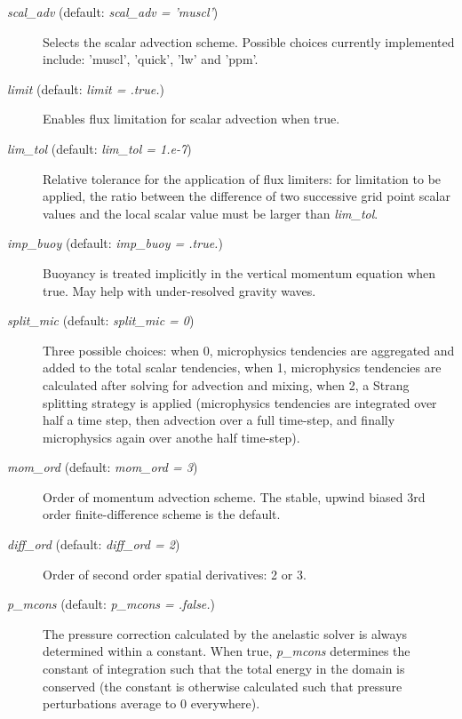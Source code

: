 \documentclass[12pt,A4,french]{article}
\begin{document}
\begin{description}

\item[{\it scal\_adv} (default: {\it scal\_adv = 'muscl'})]

Selects the scalar advection scheme. Possible choices currently implemented include: 'muscl', 'quick', 'lw' and 'ppm'.

\item[{\it limit} (default: {\it limit = .true.})]

Enables flux limitation for scalar advection when true.

\item[{\it lim\_tol} (default: {\it lim\_tol = 1.e-7})]

Relative tolerance for the application of flux limiters: for limitation to be applied, the ratio between the difference of two successive grid point scalar values and the local scalar value must be larger than {\it lim\_tol}.

\item[{\it imp\_buoy} (default: {\it imp\_buoy = .true.})]

Buoyancy is treated implicitly in the vertical momentum equation when true. May help with under-resolved gravity waves.

\item[{\it split\_mic} (default: {\it split\_mic = 0})]

Three possible choices: when 0, microphysics tendencies are aggregated and added to the total scalar tendencies, when 1, microphysics tendencies are calculated after solving for advection and mixing, when 2, a Strang splitting strategy is applied (microphysics tendencies are integrated over half a time step, then advection over a full time-step, and finally microphysics again over anothe half time-step).

\item[{\it mom\_ord} (default: {\it mom\_ord = 3})]

Order of momentum advection scheme. The stable, upwind biased 3rd order finite-difference scheme is the default.

\item[{\it diff\_ord} (default: {\it diff\_ord = 2})]

Order of second order spatial derivatives: 2 or 3.

\item[{\it p\_mcons} (default: {\it p\_mcons = .false.})]

The pressure correction calculated by the anelastic solver is always determined within a constant. When true, {\it p\_mcons} determines the constant of integration such that the total energy in the domain is conserved (the constant is otherwise calculated such that pressure perturbations average to 0 everywhere).


\end{description}
\end{document}
